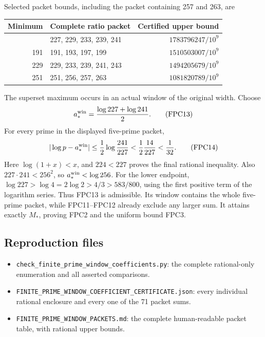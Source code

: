 \documentclass[
  10pt,
  a4paper,
]{article}
\newcounter{none} %
\providecommand{\tightlist}{%
  \setlength{\itemsep}{0pt}\setlength{\parskip}{0pt}}
\begin{document}
Selected packet bounds, including the packet containing 257 and 263, are

{\def\LTcaptype{none} %
\begin{longtable}[]{@{}rlr@{}}
\toprule\noalign{}
Minimum & Complete ratio packet & Certified upper bound \\
\midrule\noalign{}
\endhead
\bottomrule\noalign{}
\endlastfoot
227 & 227, 229, 233, 239, 241 & \(1783796247/10^9\) \\
191 & 191, 193, 197, 199 & \(1510503007/10^9\) \\
229 & 229, 233, 239, 241, 243 & \(1494205679/10^9\) \\
251 & 251, 256, 257, 263 & \(1081820789/10^9\) \\
\end{longtable}
}

The superset maximum occurs in an actual window of the original width.
Choose \[
a_*^{\rm win}=\frac{\log227+\log241}{2}.
\tag{FPC13}
\] For every prime in the displayed five-prime packet, \[
|\log p-a_*^{\rm win}|
\le\frac12\log\frac{241}{227}
<\frac12\frac{14}{227}<\frac1{32}.
\tag{FPC14}
\] Here \(\log(1+x)<x\), and \(224<227\) proves the final rational
inequality. Also \(227\cdot241<256^2\), so \(a_*^{\rm win}<\log256\).
For the lower endpoint, \(\log227>\log4=2\log2>4/3>583/800\), using the
first positive term of the logarithm series. Thus FPC13 is admissible.
Its window contains the whole five-prime packet, while FPC11--FPC12
already exclude any larger sum. It attains exactly \(M_*\), proving FPC2
and the uniform bound FPC3.

\subsection{Reproduction files}\label{reproduction-files}

\begin{itemize}
\tightlist
\item
  \texttt{check\_\allowbreak{}finite\_\allowbreak{}prime\_\allowbreak{}window\_\allowbreak{}coefficients.\allowbreak{}py}: the complete
  rational-only enumeration and all asserted comparisons.
\item
  \texttt{FINITE\_\allowbreak{}PRIME\_\allowbreak{}WINDOW\_\allowbreak{}COEFFICIENT\_\allowbreak{}CERTIFICATE.\allowbreak{}json}: every
  individual rational enclosure and every one of the 71 packet sums.
\item
  \texttt{FINITE\_\allowbreak{}PRIME\_\allowbreak{}WINDOW\_\allowbreak{}PACKETS.\allowbreak{}md}: the complete
  human-readable packet table, with rational upper bounds.
\end{itemize}
\end{document}
